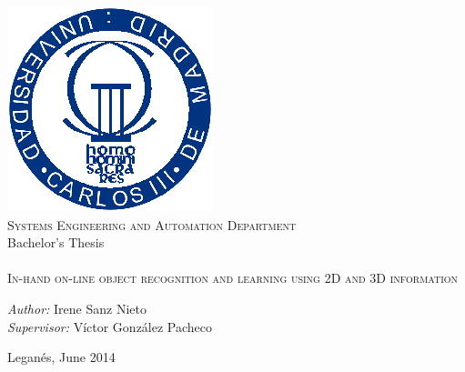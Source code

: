 \begin{titlepage}
	\begin{center}

		 \includegraphics[size=0.8]{img/uc3m.eps}  \\[0.5 cm]

		\large \textsc{Systems Engineering and Automation Department} \\ [1 cm]

		\large Bachelor's Thesis\\[1 cm]
		\Huge {} \\[1 cm]
		\huge \textsc{In-hand on-line object recognition and learning using 2D and 3D information}\\[8 cm]


		\begin{flushright} \Large
			\emph{Author:} Irene Sanz Nieto\\[0.5 cm]
			\emph{Supervisor:} Víctor González Pacheco \\
		\end{flushright}

		\vfill

		{\large Leganés, June 2014}

	\end{center}
\end{titlepage}
